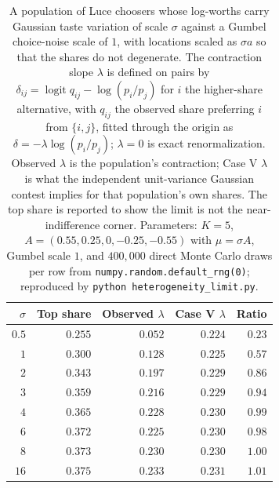 \documentclass[11pt]{article}
\theoremstyle{italichead}
\begin{document}
\begin{table}[htbp]
\centering
\small
\begin{tabular}{rrrrr}
\toprule
$\sigma$ & Top share & Observed $\lambda$ & Case V $\lambda$ & Ratio \\
\midrule
$0.5$ & $0.255$ & $0.052$ & $0.224$ & $0.23$ \\
$1$ & $0.300$ & $0.128$ & $0.225$ & $0.57$ \\
$2$ & $0.343$ & $0.197$ & $0.229$ & $0.86$ \\
$3$ & $0.359$ & $0.216$ & $0.229$ & $0.94$ \\
$4$ & $0.365$ & $0.228$ & $0.230$ & $0.99$ \\
$6$ & $0.372$ & $0.225$ & $0.230$ & $0.98$ \\
$8$ & $0.373$ & $0.230$ & $0.230$ & $1.00$ \\
$16$ & $0.375$ & $0.233$ & $0.231$ & $1.01$ \\
\bottomrule
\end{tabular}
\caption{A population of Luce choosers whose log-worths carry Gaussian taste variation of
scale $\sigma$ against a Gumbel choice-noise scale of $1$, with locations scaled as
$\sigma a$ so that the shares do not degenerate. The contraction slope $\lambda$ is defined on
pairs by $\delta_{ij} = \operatorname{logit} q_{ij} - \log(p_i/p_j)$ for $i$ the
higher-share alternative, with $q_{ij}$ the observed share preferring $i$ from
$\{i,j\}$, fitted through the origin as $\delta = -\lambda \log(p_i/p_j)$; $\lambda = 0$ is
exact renormalization. Observed $\lambda$ is the population's
contraction; Case V $\lambda$ is what the independent unit-variance Gaussian contest implies
for that population's own shares. The top share is reported to show the limit is not the
near-indifference corner. Parameters: $K = 5$, $A = (0.55, 0.25, 0, -0.25, -0.55)$ with
$\mu = \sigma A$, Gumbel scale $1$, and $400{,}000$ direct Monte Carlo draws per row from
\texttt{numpy.random.default\_rng(0)}; reproduced by
\texttt{python heterogeneity\_limit.py}.}
\label{tab:mixture}
\end{table}
\end{document}
